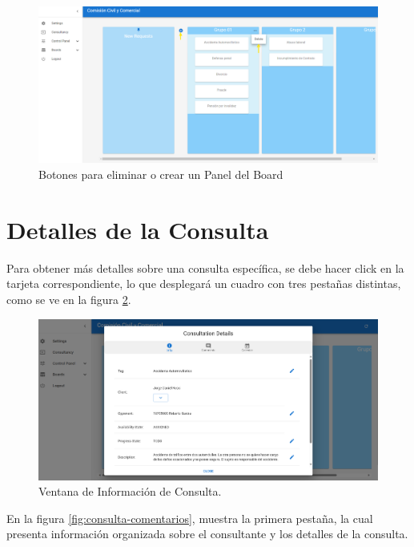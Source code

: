 \begin{figure}[H]
    \centering
    \includegraphics[width=1\linewidth]{fig/delete-panel.png}
    \caption{Botones para eliminar o crear un Panel del Board}
    \label{fig:delete-panel}
\end{figure}





\section{Detalles de la Consulta}\label{sec:info-consulta}

Para obtener más detalles sobre una consulta específica, se debe hacer click en la tarjeta correspondiente, lo que desplegará un cuadro con tres pestañas distintas, como se ve en la figura \ref{fig:consulta-info}.

\begin{figure}[H]
    \centering
    \includegraphics[width=1\linewidth]{fig/info-consulta.png}
    \caption{Ventana de Información de Consulta.}
    \label{fig:consulta-info}
\end{figure}

En la figura \ref{fig:consulta-comentarios}, muestra la primera pestaña, la cual presenta información organizada sobre el consultante y los detalles de la consulta.


